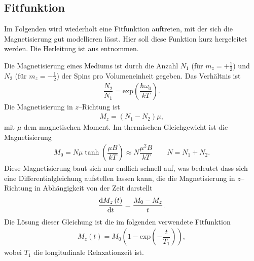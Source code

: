 \documentclass[10pt]{article}
\begin{document}
\begin{multicols}{2}
\subsection{Fitfunktion}
Im Folgenden wird wiederholt eine Fitfunktion auftreten, mit der sich die Magnetisierung gut modellieren lässt.
Hier soll diese Funktion kurz hergeleitet werden.
Die Herleitung ist aus \cite{TeachSpin} entnommen.

Die Magnetisierung eines Mediums ist durch die Anzahl $N_1$ (für $m_z=+\tfrac{1}{2}$) und $N_2$ (für $m_z=-\tfrac{1}{2}$) der Spins pro Volumeneinheit gegeben.
Das Verhältnis ist
\begin{align} 
        \dfrac{N_2}{N_1}=\text{exp}\left(\dfrac{\hbar \omega _0}{kT}\right)
.\end{align} 
Die Magnetisierung in $z$--Richtung ist
\begin{align} 
        M_z=\left(N_1-N_2\right)\mu 
,\end{align} 
mit $\mu $ dem magnetischen Moment.
Im thermischen Gleichgewicht ist die Magnetisierung
\begin{align} 
        M_0=N\mu \tanh \left(\dfrac{\mu B}{kT}\right)\approx N\dfrac{\mu ^2B}{kT}\qquad N=N_1+N_2
.\end{align} 
Diese Magnetisierung baut sich nur endlich schnell auf, was bedeutet dass sich eine Differentialgleichung aufstellen lassen kann, die die Magnetisierung in $z$--Richtung in Abhängigkeit von der Zeit darstellt
\begin{align} 
        \diff[]{M_z\left(t\right)}{t}=\dfrac{M_0-M_z}{t}
.\end{align} 
Die Lösung dieser Gleichung ist die im folgenden verwendete Fitfunktion
\begin{align} 
        M_z\left(t\right)=M_0\left(1-\text{exp}\left(-\dfrac{t}{T_1}\right)\right)
,\end{align} 
wobei $T_1$ die longitudinale Relaxationzeit ist.


\end{multicols}
\end{document}

